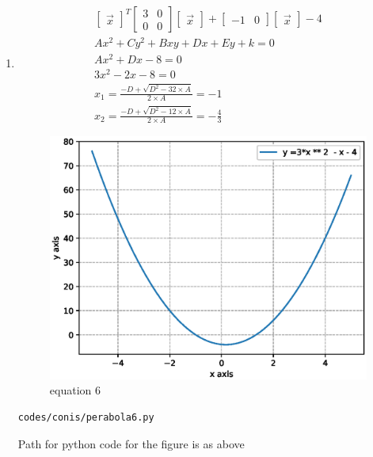 \begin{enumerate}[label=\arabic*.,ref=\thesubsection.\theenumi]
\item
\begin{align}
\begin{bmatrix}\vec x\end{bmatrix}^T\begin{bmatrix}3 & 0\\0 & 0\end{bmatrix}\begin{bmatrix}\vec x\end{bmatrix} + \begin{bmatrix}-1 & 0\end{bmatrix}\begin{bmatrix}\vec x\end{bmatrix} -4
\\
Ax^2+Cy^2+Bxy+Dx+Ey+k =0
\\
Ax^2 + Dx-8= 0
\\
3x^2-2x-8= 0
\\
x_1 =  \frac{-D + \sqrt{D^2 - 32\times A }}{2\times A} =  -1
\\
x_2 =\frac{-D + \sqrt{D^2 - 12\times A }}{2\times A} = -\frac{4}{3}
\end{align}
\begin{figure}[!ht]
	\centering
	\includegraphics[width=\columnwidth]{./figures/conics/perabola6.eps}
	\caption{equation 6 }
	\label{fig:perabola6}
\end{figure}
  
\begin{lstlisting}
codes/conis/perabola6.py
\end{lstlisting}
Path for python code for the figure is as above
\end{enumerate}